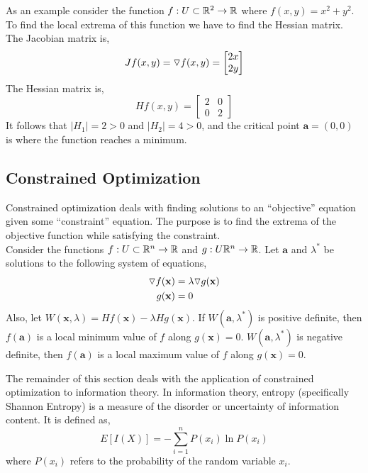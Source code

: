 \documentclass[12pt]{article}
\begin{document}
 As an example consider the function $f:U\subset\mathbb{R}^2\rightarrow\mathbb{R}$ where $f(x,y) = x^2 + y^2$. To find the local extrema of this function we have to find the Hessian matrix. The Jacobian matrix is,
\[
Jf(x,y) = \triangledown f(x,y) =
\begin{bmatrix}
 2x \\
 2y                                           
\end{bmatrix}
\]
 The Hessian matrix is,
\[
Hf(x,y) = 
\begin{bmatrix}
2 & 0 \\
0 & 2
\end{bmatrix}
\]
It follows that $|H_1|=2>0$ and $|H_2|=4>0$, and the critical point $\mathbf{a}=(0,0)$ is where the function reaches a minimum. \\

\subsection{Constrained Optimization}

Constrained optimization deals with finding solutions to an ``objective'' equation given some ``constraint'' equation. The purpose is to find the extrema of the objective function while satisfying the constraint. \\

Consider the functions $f:U\subset\mathbb{R}^n\rightarrow\mathbb{R}$ and $g:U\mathbb{R}^n\rightarrow\mathbb{R}$. Let $\mathbf{a}$ and $\lambda^*$ be solutions to the following system of equations,
\begin{align*}
\triangledown f(\mathbf{x}) &= \lambda\triangledown g(\mathbf{x}) \\
g(\mathbf{x}) &= 0
\end{align*}
Also, let $W(\mathbf{x},\lambda) = Hf(\mathbf{x})-\lambda Hg(\mathbf{x})$. If $W(\mathbf{a},\lambda^*)$ is positive definite, then $f(\mathbf{a})$ is a local minimum value of $f$ along $g(\mathbf{x}) = 0$. $W(\mathbf{a},\lambda^*)$ is negative definite, then $f(\mathbf{a})$ is a local maximum value of $f$ along $g(\mathbf{x}) = 0$.

The remainder of this section deals with the application of constrained optimization to information theory. In information theory, entropy (specifically Shannon Entropy) is a measure of the disorder or uncertainty of information content. It is defined as,
\[
E[I(X)] = -\sum_{i=1}^{n} P(x_i)\ln P(x_i)
\]
where $P(x_i)$ refers to the probability of the random variable $x_i$.  \\
\end{document}
